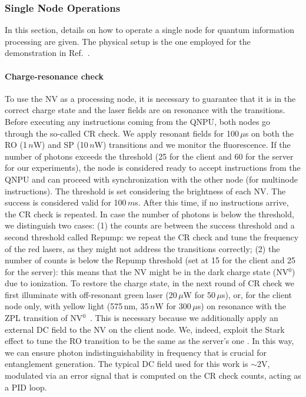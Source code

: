 \subsubsection{Single Node Operations}

In this section, details on how to operate a single node for quantum information processing are given. The physical setup is the one employed for the demonstration in Ref.~\cite{pompili_2022_experimental}.

\paragraph{Charge-resonance check}

To use the \ac{NV} as a processing node, it is necessary to guarantee that it is in the correct charge state and the laser fields are on resonance with the transitions. Before executing any instructions coming from the \ac{QNPU}, both nodes go through the so-called \ac{CR} check. We apply resonant fields for 100\,$\mu$s on both the \ac{RO} (1\,$n$W) and \ac{SP} (10\,$n$W) transitions and we monitor the fluorescence. If the number of photons exceeds the threshold (25 for the client and 60 for the server for our experiments), the node is considered ready to accept instructions from the \ac{QNPU} and can proceed with synchronization with the other node (for multinode instructions). The threshold is set considering the brightness of each \ac{NV}. The success is considered valid for 100\,$m$s. After this time, if no instructions arrive, the \ac{CR} check is repeated. In case the number of photons is below the threshold, we distinguish two cases: (1) the counts are between the success threshold and a second threshold called Repump: we repeat the \ac{CR} check and tune the frequency of the red lasers, as they might not address the transitions correctly; (2) the number of counts is below the Repump threshold (set at 15 for the client and 25 for the server): this means that the \ac{NV} might be in the dark charge state (\ac{NV}$^{0}$) due to ionization. To restore the charge state, in the next round of \ac{CR} check we first illuminate with off-resonant green laser (20\,$\mu$W for 50\,$\mu$s), or, for the client node only, with yellow light (575\,nm, 35\,$n$W for 300\,$\mu$s) on resonance with the \ac{ZPL} transition of \ac{NV}$^{0}$~\cite{baier_2020}. This is necessary because we additionally apply an external DC field to the \ac{NV} on the client node. We, indeed, exploit the Stark effect to tune the \ac{RO} transition to be the same as the server's one \cite{basssett_2011}. In this way, we can ensure photon indistinguishability in frequency that is crucial for entanglement generation. The typical DC field used for this work is $\sim$2V, modulated via an error signal that is computed on the \ac{CR} check counts, acting as a \ac{PID} loop.

